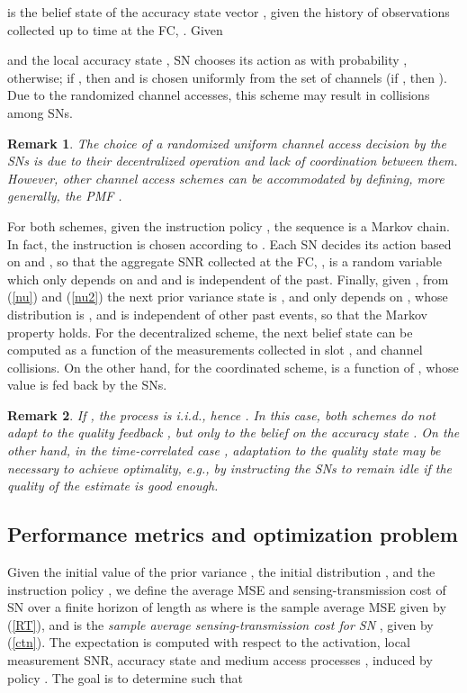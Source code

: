 \documentclass[10pt,twocolumn,twoside]{IEEEtran}
\theoremstyle{plain}
\newtheorem{remark}{Remark}
\begin{document}
is the belief state of the accuracy state vector , given the history of observations collected up to time  at the FC, . 
Given 

and the local accuracy state ,
 SN  chooses its action 
as  with probability ,
 otherwise; if , then
 and  is chosen uniformly from the set of  channels 
{(if , then ).}
Due to the randomized channel accesses, this scheme may result in collisions among SNs.
\vspace{-3mm}
\begin{remark}
\label{PMF}
The choice of a randomized uniform channel access decision by the SNs is due to their decentralized operation and 
lack of coordination between them. However, other channel access schemes can be accommodated by defining, more generally, the PMF .
\end{remark}


For both schemes, given the instruction policy ,
the sequence  is a Markov chain.
In fact, the instruction  is chosen according to
.
Each SN decides its action  based on
 and , so that the aggregate SNR collected at the FC, , is a random variable
 which only depends on  and  and is independent of the past.
Finally, given , from (\ref{nu}) and (\ref{nu2}) the next prior variance state is
, and 
only depends on , whose distribution is , and is independent of other past events, so that the Markov property holds.
For the decentralized scheme, the next belief state  can be computed as a function of 
 the measurements collected in slot , and channel collisions.
On the other hand, for the coordinated scheme,  is a function of ,
whose value is fed back by the SNs.
\vspace{-3mm}
\begin{remark}
\label{remiid}
If , the process  is i.i.d., hence . In this case, both schemes do not adapt to the quality feedback , but only to the belief on the accuracy state 
. On the other hand, in the time-correlated case , adaptation to the quality state  may be necessary to achieve optimality, \emph{e.g.}, by instructing the SNs to remain idle if the quality of the estimate is good enough.
\end{remark}
\vspace{-8mm}
\subsection{Performance metrics and optimization problem}
\label{sec:optprob}
\noindent Given the initial value of the prior variance , the initial distribution , and the instruction policy ,
we define the average MSE and sensing-transmission cost of SN   over a finite horizon of length 
as 
{
where  is the sample average MSE given by (\ref{RT}),
and 
is the \emph{sample average sensing-transmission cost for SN }, given by (\ref{ctn})}.
The expectation is computed with respect to the activation, local measurement SNR, accuracy state and medium access processes 
, induced by policy .
The goal is to determine  such that
\end{document}
